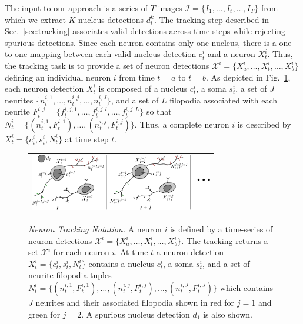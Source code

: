 
\vspace{-3mm}

The  input to  our approach  is a  series of  $T$ images  $\mathcal{I}  = \{I_1,
\ldots,  I_t,  \ldots, I_T\}$  from  which  we  extract $K$  nucleus  detections
$d_t^k$.   The  tracking step  described  in Sec.~\ref{sec:tracking}  associates
valid detections  across time steps  while rejecting spurious  detections. Since
each neuron  contains only  one nucleus, there  is a one-to-one  mapping between
each valid  nucleus detection $c_t^i$ and  a neuron $X_t^i$.  Thus, the tracking
task   is   to  provide   a   set   of   neuron  detections   $\mathcal{X}^i   =
\{X_{a}^i,\ldots,X_t^i,\ldots,X_{b}^i \}$ defining an individual neuron $i$ from
time  $t=a$  to $t=b$.   As  depicted  in  Fig.~\ref{fig:notation}, each  neuron
detection $X_t^i$ is composed of a nucleus $c_t^i$, a soma $s_t^i$, a set of $J$
neurites $\{n_t^{i,1},  \ldots, n_t^{i,j}, \ldots,  n_t^{i,J} \}$, and a  set of
$L$     filopodia    associated     with    each     neurite     $F_t^{i,j}    =
\{f_t^{i,j,1},\ldots,f_t^{i,j,l},\ldots,f_t^{i,j,L}  \}$ so  that  $N_t^i =  \{(
n_t^{i,1},F_t^{i,1}), \ldots,(n_t^{i,j},F_t^{i,j}) \}$.  Thus, a complete neuron
$i$ is described by $X_t^i = \{ c_t^i, s_t^i, N_t^i \}$ at time step $t$.


\begin{figure}[t]
  \begin{center}
       \begin{tabular}{c}
        \includegraphics[width = 80mm] {images/neurondrawing.pdf}\\ [-2.4ex]
       \end{tabular} 
    \caption{  {\footnotesize  {\it Neuron  Tracking  Notation.  }   A
        neuron $i$  is defined by  a time-series of  neuron detections
        $\mathcal{X}^i     =     \{X_{a}^i,\ldots,X_t^i,\ldots,X_{b}^i
        \}$.  The  tracking returns  a  set  $\mathcal{X}^i$ for  each
        neuron $i$.  At time $t$ a neuron detection $X_t^i = \{ c_t^i,
        s_t^i, N_t^i  \}$ contains a nucleus $c_t^i$,  a soma $s_t^i$,
        and    a  set of   neurite-filopodia    tuples    $N_t^i     =    \{(
        n_t^{i,1},F_t^{i,1}),   \ldots,(n_t^{i,j},F_t^{i,j}),  \ldots,
        (n_t^{i,J},F_t^{i,J})  \}$  which  contains $J$  neurites  and
        their associated  filopodia shown in  red for $j=1$  and green
        for  $j=2$. A spurious nucleus  detection  $d_1$ is also shown.}}
    \label{fig:notation}
  \end{center}
\vspace{-9mm}
\end{figure}

